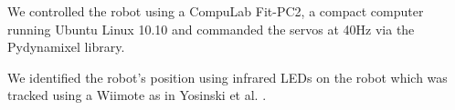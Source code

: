 We controlled the robot using a CompuLab Fit-PC2, a compact computer running Ubuntu Linux 10.10 and commanded the servos at 40Hz via the Pydynamixel library. 



We identified the robot's position using infrared LEDs on the robot which was tracked using a Wiimote as in Yosinski et al. \cite{yos:clune}.



